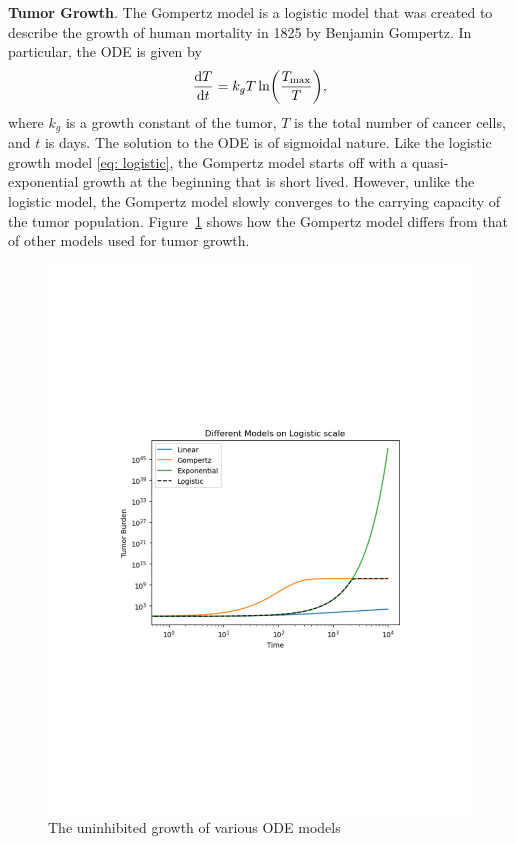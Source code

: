\documentclass[11pt]{amsart}
\begin{document}
\textbf{Tumor Growth}. The Gompertz model is a logistic model that was created to describe the growth of human mortality in 1825 by Benjamin Gompertz.
In particular, the ODE is given by
\begin{equation}
	\frac{\mathop{}\!\mathrm{d} T}{\mathop{}\!\mathrm{d} t} = k_g T \ln \biggl(\frac{T_{\max}}{T} \biggr) \label{eq: gompertz},
\end{equation}
where $k_g$ is a growth constant of the tumor, $T$ is the total number of cancer cells, and $t$ is days.
The solution to the ODE is of sigmoidal nature.
Like the logistic growth model \eqref{eq: logistic}, the Gompertz model starts off with a quasi-exponential growth at the beginning that is short lived.
However, unlike the logistic model, the Gompertz model slowly converges to the carrying capacity of the tumor population.
Figure~\ref{fig:odeModels} shows how the Gompertz model differs from that of other models used for tumor growth.

\begin{figure}
  \centering
    \vspace*{-42mm}
    	\begin{varwidth}{\linewidth}
		 \includegraphics[scale=0.5]{./images/ode_models.pdf}
		 \captionsetup{justification=centering, width=5cm}
		 \caption{The uninhibited growth of various ODE models}
		 \label{fig:odeModels}
	\end{varwidth}
	\vspace*{-40mm}
\end{figure}
\end{document}
